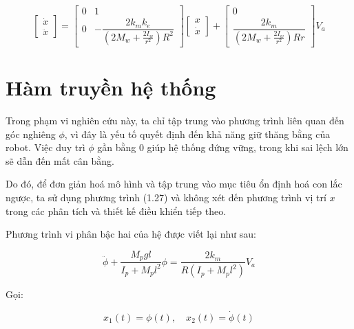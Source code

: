             \begin{equation}
                \begin{bmatrix}
                    \dot{x} \\
                    \ddot{x}
                \end{bmatrix}
                =
                \begin{bmatrix}
                    0 & 1 \\
                    0 & -\dfrac{2k_m k_e}{(2M_w + \frac{2I_w}{r^2}) R^2}
                \end{bmatrix}
                \begin{bmatrix}
                    x \\
                    \dot{x}
                \end{bmatrix}
                +
                \begin{bmatrix}
                    0 \\
                    \dfrac{2k_m}{(2M_w + \frac{2I_w}{r^2}) R r}
                \end{bmatrix}
                V_a
            \end{equation}
    \section{Hàm truyền hệ thống}
        \hspace*{0.6cm}Trong phạm vi nghiên cứu này, ta chỉ tập trung vào phương trình liên quan đến góc nghiêng $\phi$, vì đây là yếu tố quyết định đến khả năng giữ thăng bằng của robot. Việc duy trì $\phi$ gần bằng 0 giúp hệ thống đứng vững, trong khi sai lệch lớn sẽ dẫn đến mất cân bằng.

        Do đó, để đơn giản hoá mô hình và tập trung vào mục tiêu ổn định hoá con lắc ngược, ta sử dụng phương trình (1.27) và không xét đến phương trình vị trí $x$ trong các phân tích và thiết kế điều khiển tiếp theo.

        Phương trình vi phân bậc hai của hệ được viết lại như sau:
        
        \begin{equation}
            \ddot{\phi} + \frac{M_p g l}{I_p + M_p l^2} \phi = \frac{2k_m}{R (I_p + M_p l^2)} V_a
        \end{equation}
        
        Gọi:
        
        \[
            x_1(t) = \phi(t), \quad x_2(t) = \dot{\phi}(t)
        \]
        
